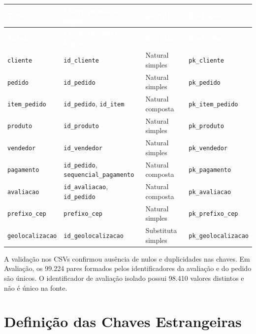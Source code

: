 \documentclass[12pt,a4paper]{article}
\begin{document}
	{\small
		\renewcommand{\arraystretch}{1.4}
		\begin{longtable}{|>{\raggedright\arraybackslash}p{2.7cm}|>{\raggedright\arraybackslash}p{5.8cm}|>{\raggedright\arraybackslash}p{2.2cm}|>{\raggedright\arraybackslash}p{3cm}|}
			\hline
			\rowcolor{AzulCorporativo}
			\textcolor{white}{\textbf{Tabela}} & \textcolor{white}{\textbf{Chave primária lógica}} & \textcolor{white}{\textbf{Estrutura}} & \textcolor{white}{\textbf{Restrição}} \\ \hline
			\endfirsthead
			\hline
			\rowcolor{AzulCorporativo}
			\textcolor{white}{\textbf{Tabela}} & \textcolor{white}{\textbf{Chave primária lógica}} & \textcolor{white}{\textbf{Estrutura}} & \textcolor{white}{\textbf{Restrição}} \\ \hline
			\endhead
			\texttt{cliente} & \texttt{id\_cliente} & Natural simples & \texttt{pk\_cliente} \\ \hline
			\texttt{pedido} & \texttt{id\_pedido} & Natural simples & \texttt{pk\_pedido} \\ \hline
			\texttt{item\_pedido} & \texttt{id\_pedido}, \texttt{id\_item} & Natural composta & \texttt{pk\_item\_pedido} \\ \hline
			\texttt{produto} & \texttt{id\_produto} & Natural simples & \texttt{pk\_produto} \\ \hline
			\texttt{vendedor} & \texttt{id\_vendedor} & Natural simples & \texttt{pk\_vendedor} \\ \hline
			\texttt{pagamento} & \texttt{id\_pedido}, \texttt{sequencial\_pagamento} & Natural composta & \texttt{pk\_pagamento} \\ \hline
			\texttt{avaliacao} & \texttt{id\_avaliacao}, \texttt{id\_pedido} & Natural composta & \texttt{pk\_avaliacao} \\ \hline
			\texttt{prefixo\_cep} & \texttt{prefixo\_cep} & Natural simples & \texttt{pk\_prefixo\_cep} \\ \hline
			\texttt{geolocalizacao} & \texttt{id\_geolocalizacao} & Substituta simples & \texttt{pk\_geolocalizacao} \\ \hline
	\end{longtable}}

	A validação nos CSVs confirmou ausência de nulos e duplicidades nas chaves. Em
	Avaliação, os 99.224 pares formados pelos identificadores da avaliação e do
	pedido são únicos. O identificador de avaliação isolado possui 98.410 valores
	distintos e não é único na fonte.

	\section{Definição das Chaves Estrangeiras}
\end{document}
